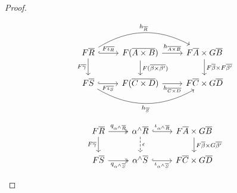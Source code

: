 \documentclass[runningheads]{llncs}
\begin{document}
\begin{proof}
\begin{figure*}[h]
  \vspace*{-0.1in}
  \hspace*{-0.2in}
  \begin{minipage}[b]{0.45\linewidth}
{\footnotesize \[
      \begin{tikzcd}
          F\overline{R}
          \ar[d, "{F\overline{\gamma}}"']
          \ar[r, hookrightarrow, "{F\overline{\iota_R}}"]
          \ar[rr, bend left, "{h_{\overline{R}}}"]
          &F(\overline{A \times B})
          \ar[d, "{F(\overline{\beta \times \beta'})}"]
          \ar[r, "{h_{\overline{A \times B}}}"]
          &F\overline{A} \times G\overline{B}
          \ar[d, "{F\overline{\beta} \times F\overline{\beta'}}"] \\
          F\overline{S}
          \ar[r, hookrightarrow, "{F\overline{\iota_S}}"']
          \ar[rr, bend right, "{h_{\overline{S}}}"']
          &F(\overline{C \times D})
          \ar[r, "{h_{\overline{C \times D}}}"']
          &F\overline{C} \times G\overline{D}
      \end{tikzcd}
      \]}
\end{minipage}\hspace*{0.3in}
  \vspace*{-0.5in}
  \begin{minipage}[b]{0.45\linewidth}
      {\footnotesize
        \[  \vspace*{0.4in}
      \begin{tikzcd}
          F\overline{R}
          \ar[d, "{F\overline{\gamma}}"']
          \ar[r, twoheadrightarrow, "{q_{\alpha^\wedge\overline{R}}}"]
          &\alpha^\wedge\overline{R}
          \ar[d, dashed, "{\epsilon}"]
          \ar[r, hookrightarrow, "{\iota_{\alpha^\wedge\overline{R}}}"]
          &F\overline{A} \times G\overline{B}
          \ar[d, "{F\overline{\beta} \times G\overline{\beta'}}"] \\
          F\overline{S}
          \ar[r, twoheadrightarrow, "{q_{\alpha^\wedge\overline{S}}}"']
          &\alpha^\wedge\overline{S}
          \ar[r, hookrightarrow, "{\iota_{\alpha^\wedge\overline{S}}}"']
          &F\overline{C} \times G\overline{D}
      \end{tikzcd}
      \]}
\end{minipage}
\end{figure*}
\end{proof}

\pagebreak

\vspace*{0.2in}
\end{document}
